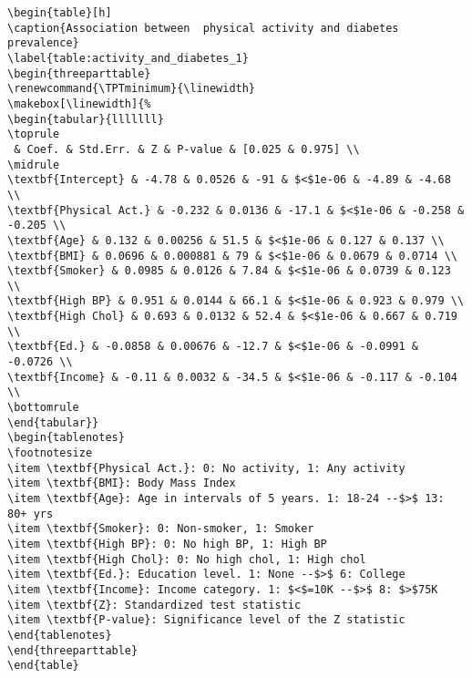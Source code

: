 \documentclass[11pt]{article}
\begin{document}
\begin{Verbatim}[tabsize=4]
\begin{table}[h]
\caption{Association between  physical activity and diabetes prevalence}
\label{table:activity_and_diabetes_1}
\begin{threeparttable}
\renewcommand{\TPTminimum}{\linewidth}
\makebox[\linewidth]{%
\begin{tabular}{lllllll}
\toprule
 & Coef. & Std.Err. & Z & P-value & [0.025 & 0.975] \\
\midrule
\textbf{Intercept} & -4.78 & 0.0526 & -91 & $<$1e-06 & -4.89 & -4.68 \\
\textbf{Physical Act.} & -0.232 & 0.0136 & -17.1 & $<$1e-06 & -0.258 & -0.205 \\
\textbf{Age} & 0.132 & 0.00256 & 51.5 & $<$1e-06 & 0.127 & 0.137 \\
\textbf{BMI} & 0.0696 & 0.000881 & 79 & $<$1e-06 & 0.0679 & 0.0714 \\
\textbf{Smoker} & 0.0985 & 0.0126 & 7.84 & $<$1e-06 & 0.0739 & 0.123 \\
\textbf{High BP} & 0.951 & 0.0144 & 66.1 & $<$1e-06 & 0.923 & 0.979 \\
\textbf{High Chol} & 0.693 & 0.0132 & 52.4 & $<$1e-06 & 0.667 & 0.719 \\
\textbf{Ed.} & -0.0858 & 0.00676 & -12.7 & $<$1e-06 & -0.0991 & -0.0726 \\
\textbf{Income} & -0.11 & 0.0032 & -34.5 & $<$1e-06 & -0.117 & -0.104 \\
\bottomrule
\end{tabular}}
\begin{tablenotes}
\footnotesize
\item \textbf{Physical Act.}: 0: No activity, 1: Any activity
\item \textbf{BMI}: Body Mass Index
\item \textbf{Age}: Age in intervals of 5 years. 1: 18-24 --$>$ 13: 80+ yrs
\item \textbf{Smoker}: 0: Non-smoker, 1: Smoker
\item \textbf{High BP}: 0: No high BP, 1: High BP
\item \textbf{High Chol}: 0: No high chol, 1: High chol
\item \textbf{Ed.}: Education level. 1: None --$>$ 6: College
\item \textbf{Income}: Income category. 1: $<$=10K --$>$ 8: $>$75K
\item \textbf{Z}: Standardized test statistic
\item \textbf{P-value}: Significance level of the Z statistic
\end{tablenotes}
\end{threeparttable}
\end{table}

\end{Verbatim}
\end{document}

